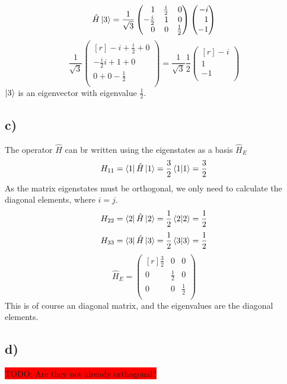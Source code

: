 \documentclass{article}
\begin{document}
\[
\hat{H}\ket{3} = \frac{1}{\sqrt{3}}
\begin{pmatrix*}[r]
1 & \frac{i}{2} & 0 \\
-\frac{i}{2} & 1 & 0 \\
0 & 0 & \frac{1}{2} \\
\end{pmatrix*}
\begin{pmatrix*}[r]
-i \\
1 \\
-1 \\
\end{pmatrix*}
\]
\[
\frac{1}{\sqrt{3}}
\begin{pmatrix*}[r]
-i + \frac{i}{2} + 0 \\
- \frac{i}{2}i + 1 + 0 \\
0 + 0 - \frac{1}{2} \\
\end{pmatrix*} = \frac{1}{\sqrt{3}} \frac{1}{2}
\begin{pmatrix*}[r]
-i \\
1 \\
-1 \\
\end{pmatrix*}
\]
$\ket{3}$ is an eigenvector with eigenvalue $\frac{1}{2}$.

\subsection*{c)} 
The operator $\hat{H}$ can br written using the eigenstates as a basis $\hat{H}_{E}$
\[
H_{11} = \bra{1}\hat{H}\ket{1} = \frac{3}{2} \bra{1}\ket{1} = \frac{3}{2}
\]
As the matrix eigenstates must be orthogonal, we only need to calculate the diagonal elements, where $i = j$. 
\[
H_{22} = \bra{2}\hat{H}\ket{2} = \frac{1}{2} \bra{2}\ket{2} = \frac{1}{2}
\]
\[
H_{33} = \bra{3}\hat{H}\ket{3} = \frac{1}{2} \bra{3}\ket{3} = \frac{1}{2}
\]
\[
\hat{H}_{E} = 
\begin{pmatrix*}[r]
\frac{3}{2} & 0 & 0 \\
0 & \frac{1}{2} & 0 \\
0 & 0 & \frac{1}{2} \\
\end{pmatrix*}
\]
This is of course an diagonal matrix, and the eigenvalues are the diagonal elements.

\subsection*{d)}
\colorbox{red}{TODO: Are they not already orthogonal?}
\end{document}
